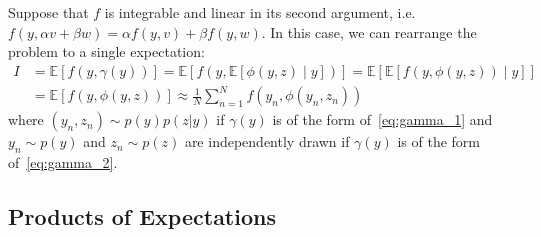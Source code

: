 Suppose that $f$ 
is integrable and linear in its second argument, i.e. $f(y,\alpha v + \beta w) = 
\alpha f(y,v)+ \beta f(y,w)$.
In this case, we can rearrange the problem to a single expectation:
\begin{align*}
I
& = \mathbb{E}\left[f(y,\gamma(y))\right] = \mathbb{E}\left[f\left(y,\mathbb{E}\left[\phi(y,z)\middle|y\right]\right)\right]
= \mathbb{E}\left[ \mathbb{E}\left[f(y,\phi(y,z))\middle|y\right]\right] \\&= \mathbb{E}\left[f(y,\phi(y,z))\right]
 \approx\frac{1}{N} \sum_{n=1}^{N} f(y_n,\phi(y_n,z_n))
\end{align*}
where $(y_n, z_n) \sim p(y)p(z|y)$ if $\gamma(y)$ is of the form of~\eqref{eq:gamma_1} and
$y_n \sim p(y)$ and $z_n \sim p(z)$ are independently drawn if $\gamma(y)$ is of the form of~\eqref{eq:gamma_2}.




\subsection{Products of Expectations}
\label{sec:products}

